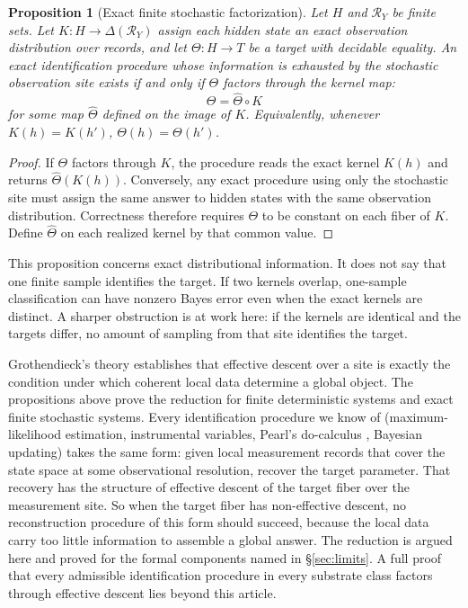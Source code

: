 \documentclass[11pt]{article}
\newtheorem*{proposition*}{Proposition}
\begin{document}
\begin{proposition*}[Exact finite stochastic factorization]
Let $H$ and $\mathcal{R}_Y$ be finite sets.
Let $K:H\to\Delta(\mathcal{R}_Y)$ assign each hidden state an exact observation
distribution over records, and let $\Theta:H\to T$ be a target with decidable
equality.
An exact identification procedure whose information is exhausted by the
stochastic observation site exists if and only if $\Theta$ factors through the
kernel map:
\[
\Theta=\widehat{\Theta}\circ K
\]
for some map $\widehat{\Theta}$ defined on the image of $K$.
Equivalently, whenever $K(h)=K(h')$, $\Theta(h)=\Theta(h')$.
\end{proposition*}

\begin{proof}
If $\Theta$ factors through $K$, the procedure reads the exact kernel $K(h)$
and returns $\widehat{\Theta}(K(h))$.
Conversely, any exact procedure using only the stochastic site must assign the
same answer to hidden states with the same observation distribution.
Correctness therefore requires $\Theta$ to be constant on each fiber of $K$.
Define $\widehat{\Theta}$ on each realized kernel by that common value.
\end{proof}

This proposition concerns exact distributional information.
It does not say that one finite sample identifies the target.
If two kernels overlap, one-sample classification can have nonzero Bayes error
even when the exact kernels are distinct.
A sharper obstruction is at work here: if the kernels are identical and the
targets differ, no amount of sampling from that site identifies the target.

\begin{sloppypar}
Grothendieck's theory \citep{grothendieck1971sga} establishes that
effective descent over a site is exactly the condition under which coherent
local data determine a global object. The propositions above prove the reduction
for finite deterministic systems and exact finite stochastic systems.
Every identification procedure we know of (maximum-likelihood estimation,
instrumental variables, Pearl's do-calculus \citep{pearl2009}, Bayesian
updating) takes the same form: given local measurement records that cover the
state space at some observational resolution, recover the target parameter. That
recovery has the structure of effective descent of the target fiber over the
measurement site. So when the target fiber has non-effective descent, no
reconstruction procedure of this form should succeed, because the local data
carry too little information to assemble a global answer. The
reduction is argued here and proved for the formal components named in
\S\ref{sec:limits}. A full proof that every admissible identification procedure
in every substrate class factors through effective descent lies beyond this
article.
\end{sloppypar}
\end{document}
